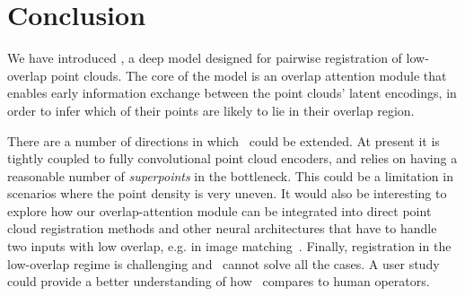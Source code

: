 \section{Conclusion}
We have introduced \acro, a deep model designed for pairwise registration of low-overlap point clouds. The core of the model is an overlap attention module that enables early information exchange between the point clouds' latent encodings, in order to infer which of their points are likely to lie in their overlap region.

There are a number of directions in which \acro\ could be extended. At present it is tightly coupled to fully convolutional point cloud encoders, and relies on having a reasonable number of \emph{superpoints} in the bottleneck. This could be a limitation in scenarios where the point density is very uneven. It would also be interesting to explore how our overlap-attention module can be integrated into direct point cloud registration methods and other neural architectures that have to handle two inputs with low overlap, e.g. in image matching~\cite{sarlin2020superglue}. Finally, registration in the low-overlap regime is challenging and \acro\ cannot solve all the cases. A user study could provide a better understanding of how \acro\ compares to human operators.